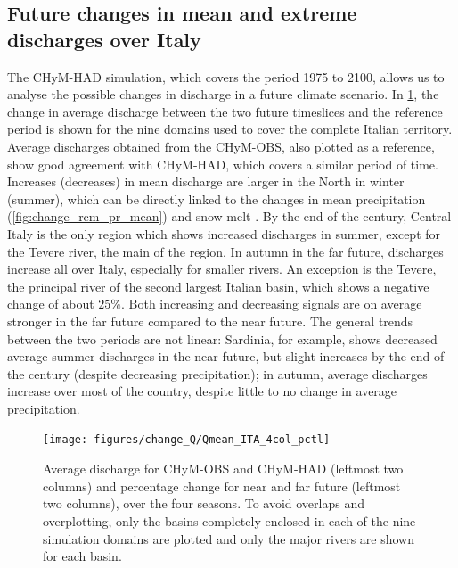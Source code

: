 \subsection{Future changes in mean and extreme discharges over Italy}
The CHyM-HAD simulation, which covers the period 1975 to 2100, allows us to analyse the possible changes in discharge in a future climate scenario.
In \cref{fig:change_qmean_hadgem}, the change in average discharge between the two future timeslices and the reference period is shown for the nine domains used to cover the complete Italian territory.
Average discharges obtained from the CHyM-OBS, also plotted as a reference, show good agreement with CHyM-HAD, which covers a similar period of time.
Increases (decreases) in mean discharge are larger in the North in winter (summer), which can be directly linked to the changes in mean precipitation (\cref{fig:change_rcm_pr_mean}) and snow melt \citep{coppola2014ChahydconPobasundglowar}.
By the end of the century, Central Italy is the only region which shows increased discharges in summer, except for the Tevere river, the main of the region.
In autumn in the far future, discharges increase all over Italy, especially for smaller rivers.
An exception is the Tevere, the principal river of the second largest Italian basin, which shows a negative change of about $25\%$. 
Both increasing and decreasing signals are on average stronger in the far future compared to the near future.
The general trends between the two periods are not linear: Sardinia, for example, shows decreased average summer discharges in the near future, but slight increases by the end of the century (despite decreasing precipitation); in autumn, average discharges increase over most of the country, despite little to no change in average precipitation. 
\begin{figure}
    \centering
    \texttt{[image: figures/change\_Q/Qmean\_ITA\_4col\_pctl]}
    \decoRule
    \caption[Average discharge change in CHyM (HadGEM)]{
        Average discharge for CHyM-OBS and CHyM-HAD (leftmost two columns) and percentage change for near and far future (leftmost two columns), over the four seasons. To avoid overlaps and overplotting, only the basins completely enclosed in each of the nine simulation domains are plotted and only the major rivers are shown for each basin.
    } \label{fig:change_qmean_hadgem}
\end{figure}

